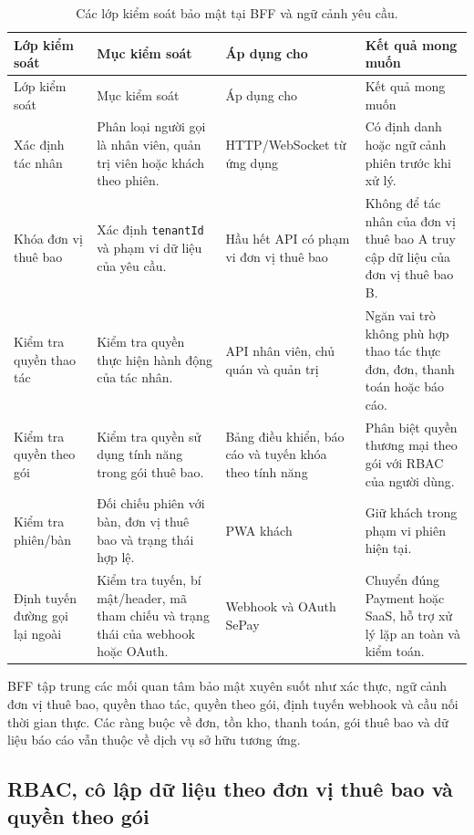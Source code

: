 {\scriptsize
\setlength{\tabcolsep}{3pt}
\begin{longtable}{>{\raggedright\arraybackslash}p{}>{\raggedright\arraybackslash}p{}>{\raggedright\arraybackslash}p{}>{\raggedright\arraybackslash}p{}}
  \caption{Các lớp kiểm soát bảo mật tại BFF và ngữ cảnh yêu cầu.}
  \label{tab:chapter4-security-control-layers}\\
  \toprule
  Lớp kiểm soát & Mục kiểm soát & Áp dụng cho & Kết quả mong muốn \\
  \midrule
  \endfirsthead
  \toprule
  Lớp kiểm soát & Mục kiểm soát & Áp dụng cho & Kết quả mong muốn \\
  \midrule
  \endhead
  Xác định tác nhân & Phân loại người gọi là nhân viên, quản trị viên hoặc khách theo phiên. & HTTP/WebSocket từ ứng dụng & Có định danh hoặc ngữ cảnh phiên trước khi xử lý. \\
  Khóa đơn vị thuê bao & Xác định \texttt{tenantId} và phạm vi dữ liệu của yêu cầu. & Hầu hết API có phạm vi đơn vị thuê bao & Không để tác nhân của đơn vị thuê bao A truy cập dữ liệu của đơn vị thuê bao B. \\
  Kiểm tra quyền thao tác & Kiểm tra quyền thực hiện hành động của tác nhân. & API nhân viên, chủ quán và quản trị & Ngăn vai trò không phù hợp thao tác thực đơn, đơn, thanh toán hoặc báo cáo. \\
  Kiểm tra quyền theo gói & Kiểm tra quyền sử dụng tính năng trong gói thuê bao. & Bảng điều khiển, báo cáo và tuyến khóa theo tính năng & Phân biệt quyền thương mại theo gói với RBAC của người dùng. \\
  Kiểm tra phiên/bàn & Đối chiếu phiên với bàn, đơn vị thuê bao và trạng thái hợp lệ. & PWA khách & Giữ khách trong phạm vi phiên hiện tại. \\
  Định tuyến đường gọi lại ngoài & Kiểm tra tuyến, bí mật/header, mã tham chiếu và trạng thái của webhook hoặc OAuth. & Webhook và OAuth SePay & Chuyển đúng Payment hoặc SaaS, hỗ trợ xử lý lặp an toàn và kiểm toán. \\
  \bottomrule
\end{longtable}
}

BFF tập trung các mối quan tâm bảo mật xuyên suốt như xác thực, ngữ cảnh đơn vị thuê bao, quyền thao tác, quyền theo gói, định tuyến webhook và cầu nối thời gian thực. Các ràng buộc về đơn, tồn kho, thanh toán, gói thuê bao và dữ liệu báo cáo vẫn thuộc về dịch vụ sở hữu tương ứng.

\subsection{RBAC, cô lập dữ liệu theo đơn vị thuê bao và quyền theo gói}

